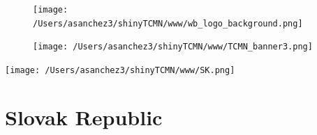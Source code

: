 \documentclass{article}\usepackage[]{graphicx}\usepackage[]{color}
\begin{document}
%

\begin{figure}
  \vspace{-3ex} %
  \hspace{-7ex} %
  \texttt{[image: /Users/asanchez3/shinyTCMN/www/wb\_logo\_background.png]}
\end{figure}
\begin{figure}
  \begin{minipage}[t]{0.99\textwidth} %
      \vspace{-30ex}
      \hspace{-2ex}
      \raggedright{\texttt{[image: /Users/asanchez3/shinyTCMN/www/TCMN\_banner3.png]}}
  \end{minipage}
\end{figure}
%
\begin{minipage}[t]{0.99\textwidth} %
  \vspace{-1.5cm}
  \begin{minipage}[c]{0.36\textwidth} 
    \begin{minipage}[c]{0.28\textwidth} %
      \texttt{[image: /Users/asanchez3/shinyTCMN/www/SK.png]}
    \end{minipage}
    \begin{minipage}[c]{0.70\textwidth} %
      \section*{\color{blue!40!black}Slovak Republic}
    \end{minipage}
  \end{minipage}
  \begin{minipage}[c]{0.63\textwidth} %
    \centering
  \end{minipage}  
\end{minipage} %
\end{document}
